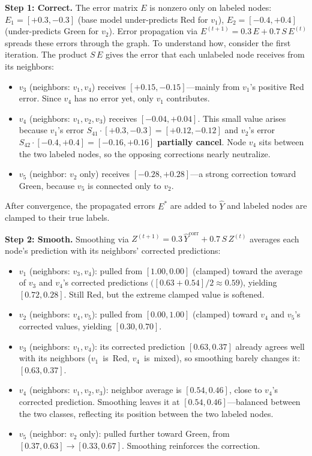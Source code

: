 \begin{notechapter}
\textbf{Step 1: Correct.} The error matrix $E$ is nonzero only on labeled
nodes: $E_1 = [+0.3, -0.3]$ (base model under-predicts Red for $v_1$),
$E_2 = [-0.4, +0.4]$ (under-predicts Green for $v_2$). Error propagation
via $E^{(t+1)} = 0.3\,E + 0.7\,S\,E^{(t)}$ spreads these errors through
the graph. To understand how, consider the first iteration. The product
$S\,E$ gives the error that each unlabeled node receives from its neighbors:
\begin{itemize}
    \item $v_3$ (neighbors: $v_1, v_4$) receives $[+0.15, -0.15]$---mainly
          from $v_1$'s positive Red error. Since $v_4$ has no error yet,
          only $v_1$ contributes.
    \item $v_4$ (neighbors: $v_1, v_2, v_3$) receives $[{-0.04}, {+0.04}]$.
          This small value arises because $v_1$'s error
          $S_{41}\!\cdot\![+0.3,-0.3] = [+0.12, -0.12]$ and $v_2$'s error
          $S_{42}\!\cdot\![-0.4,+0.4] = [-0.16, +0.16]$ \textbf{partially
          cancel}. Node $v_4$ sits between the two labeled nodes, so the
          opposing corrections nearly neutralize.
    \item $v_5$ (neighbor: $v_2$ only) receives $[-0.28, +0.28]$---a strong
          correction toward Green, because $v_5$ is connected only to $v_2$.
\end{itemize}
After convergence, the propagated errors $E^*$ are added to $\hat{Y}$
and labeled nodes are clamped to their true labels.
\vspace{0.5em}

\textbf{Step 2: Smooth.} Smoothing via
$Z^{(t+1)} = 0.3\,\hat{Y}^{\text{corr}} + 0.7\,S\,Z^{(t)}$ averages
each node's prediction with its neighbors' corrected predictions:
\begin{itemize}
    \item $v_1$ (neighbors: $v_3, v_4$): pulled from $[1.00, 0.00]$
          (clamped) toward the average of $v_3$ and $v_4$'s corrected
          predictions $([0.63 + 0.54]/2 \approx 0.59$), yielding
          $[0.72, 0.28]$. Still Red, but the extreme clamped value is
          softened.
    \item $v_2$ (neighbors: $v_4, v_5$): pulled from $[0.00, 1.00]$
          (clamped) toward $v_4$ and $v_5$'s corrected values, yielding
          $[0.30, 0.70]$.
    \item $v_3$ (neighbors: $v_1, v_4$): its corrected prediction
          $[0.63, 0.37]$ already agrees well with its neighbors
          ($v_1$~is~Red, $v_4$~is~mixed), so smoothing barely changes it:
          $[0.63, 0.37]$.
    \item $v_4$ (neighbors: $v_1, v_2, v_3$): neighbor average is
          $[0.54, 0.46]$, close to $v_4$'s corrected prediction. Smoothing
          leaves it at $[0.54, 0.46]$---balanced between the two classes,
          reflecting its position between the two labeled nodes.
    \item $v_5$ (neighbor: $v_2$ only): pulled further toward Green,
          from $[0.37, 0.63] \to [0.33, 0.67]$. Smoothing reinforces the
          correction.
\end{itemize}


\end{notechapter}
